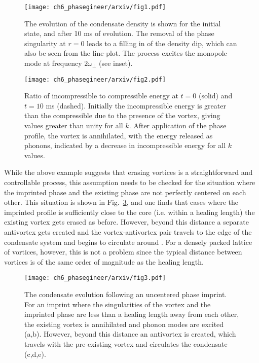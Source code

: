 \begin{figure}[h!]\centering
    \texttt{[image: ch6\_phasegineer/arxiv/fig1.pdf]}
    \caption{The evolution of the condensate density is shown for the initial state, and after 10 ms of evolution. The removal of the phase singularity at $r=0$ leads to a filling in of the density dip, which can also be seen from the line-plot. The process excites the monopole mode at frequency $2\omega_\perp$ (see inset).}\label{fig:annihilation_1vtx}
\end{figure}
\begin{figure}[h!]\centering
    \texttt{[image: ch6\_phasegineer/arxiv/fig2.pdf]}
    \caption{Ratio of incompressible to compressible energy at  $t=0$ (solid) and $t=10$ ms (dashed). Initially the incompressible energy is greater than the compressible due to the presence of the vortex, giving values greater than unity for all $k$. After application of the phase profile, the vortex is annihilated, with the energy released as phonons, indicated by a decrease in incompressible energy for all $k$ values.}\label{fig:kinspec}
\end{figure}

While the above example suggests that erasing vortices is a straightforward and controllable process, this assumption needs to be checked for the situation where the imprinted phase and the existing phase are not perfectly centered on each other. This situation is shown in Fig.~\ref{fig:annihilation_1vtx_uncentred}, and one finds that cases where the imprinted profile is sufficiently close to the core (i.e. within a healing length) the existing vortex gets erased as before. However, beyond this distance a separate antivortex gets created and the vortex-antivortex pair travels to the edge of the condensate system and begins to circulate around \cite{VTX:Martikainen_pra_2001}. For a densely packed lattice of vortices, however, this is not a problem since the typical distance between vortices is of the same order of magnitude as the healing length.

\begin{figure}[h!]\centering
    \texttt{[image: ch6\_phasegineer/arxiv/fig3.pdf]}
    \caption{The condensate evolution following an uncentered phase imprint. For an imprint where the singularities of the vortex and the imprinted phase are less than a healing length away from each other, the existing vortex is annihilated and phonon modes are excited (a,b). However, beyond this distance an antivortex is created, which travels with the pre-existing vortex and circulates the condensate (c,d,e).}\label{fig:annihilation_1vtx_uncentred}
\end{figure}


